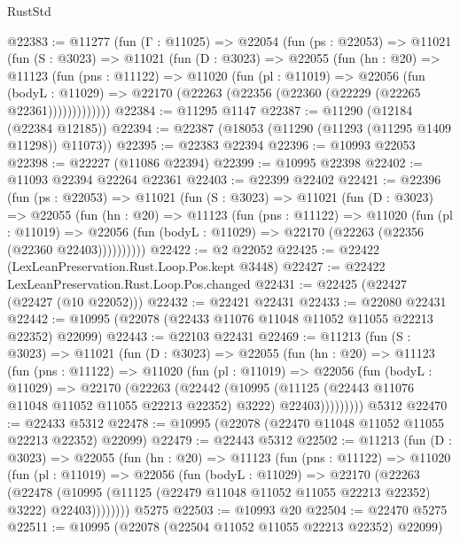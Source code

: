 \begin{lexlean}{RustStd}
\begin{coremodule}
@22383 := @11277
    (fun (Γ : @11025) =>
    @22054
      (fun (ps : @22053) =>
      @11021
        (fun (S : @3023) =>
        @11021
          (fun (D : @3023) =>
          @22055
            (fun (hn : @20) =>
            @11123
              (fun (pns : @11122) =>
              @11020
                (fun (pl : @11019) =>
                @22056
                  (fun (bodyL : @11029) =>
                  @22170 (@22263 (@22356 (@22360 (@22229 (@22265 @22361)))))))))))))
@22384 := @11295 @1147
@22387 := @11290 (@12184 (@22384 @12185))
@22394 := @22387 (@18053 (@11290 (@11293 (@11295 @1409 @11298)) @11073))
@22395 := @22383 @22394
@22396 := @10993 @22053
@22398 := @22227 (@11086 @22394)
@22399 := @10995 @22398
@22402 := @11093 @22394 @22264 @22361
@22403 := @22399 @22402
@22421 := @22396
    (fun (ps : @22053) =>
    @11021
      (fun (S : @3023) =>
      @11021
        (fun (D : @3023) =>
        @22055
          (fun (hn : @20) =>
          @11123
            (fun (pns : @11122) =>
            @11020
              (fun (pl : @11019) =>
              @22056 (fun (bodyL : @11029) => @22170 (@22263 (@22356 (@22360 @22403))))))))))
@22422 := @2 @22052
@22425 := @22422 (LexLeanPreservation.Rust.Loop.Pos.kept @3448)
@22427 := @22422 LexLeanPreservation.Rust.Loop.Pos.changed
@22431 := @22425 (@22427 (@22427 (@10 @22052)))
@22432 := @22421 @22431
@22433 := @22080 @22431
@22442 := @10995 (@22078 (@22433 @11076 @11048 @11052 @11055 @22213 @22352) @22099)
@22443 := @22103 @22431
@22469 := @11213
    (fun (S : @3023) =>
    @11021
      (fun (D : @3023) =>
      @22055
        (fun (hn : @20) =>
        @11123
          (fun (pns : @11122) =>
          @11020
            (fun (pl : @11019) =>
            @22056
              (fun (bodyL : @11029) =>
              @22170
                (@22263
                  (@22442
                    (@10995
                      (@11125 (@22443 @11076 @11048 @11052 @11055 @22213 @22352) @3222)
                      @22403)))))))))
    @5312
@22470 := @22433 @5312
@22478 := @10995 (@22078 (@22470 @11048 @11052 @11055 @22213 @22352) @22099)
@22479 := @22443 @5312
@22502 := @11213
    (fun (D : @3023) =>
    @22055
      (fun (hn : @20) =>
      @11123
        (fun (pns : @11122) =>
        @11020
          (fun (pl : @11019) =>
          @22056
            (fun (bodyL : @11029) =>
            @22170
              (@22263
                (@22478
                  (@10995 (@11125 (@22479 @11048 @11052 @11055 @22213 @22352) @3222) @22403))))))))
    @5275
@22503 := @10993 @20
@22504 := @22470 @5275
@22511 := @10995 (@22078 (@22504 @11052 @11055 @22213 @22352) @22099)

\end{coremodule}
\end{lexlean}
